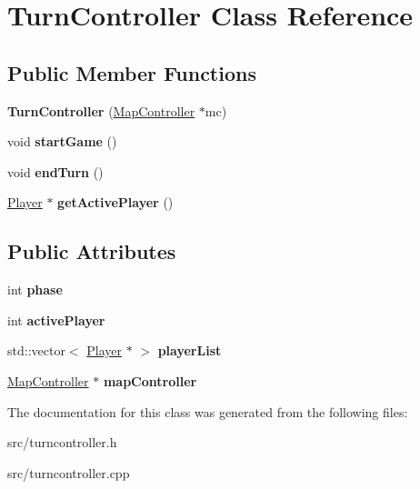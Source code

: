 \hypertarget{class_turn_controller}{}\section{Turn\+Controller Class Reference}
\label{class_turn_controller}
\subsection*{Public Member Functions}
\begin{DoxyCompactItemize}
\item 
\hypertarget{class_turn_controller_aa9e4a3c63544a55349a11c49f5a27d92}{}{\bfseries Turn\+Controller} (\hyperlink{class_map_controller}{Map\+Controller} $\ast$mc)\label{class_turn_controller_aa9e4a3c63544a55349a11c49f5a27d92}

\item 
\hypertarget{class_turn_controller_af0bf05ca649fe7b08a6fee6f7d0f4594}{}void {\bfseries start\+Game} ()\label{class_turn_controller_af0bf05ca649fe7b08a6fee6f7d0f4594}

\item 
\hypertarget{class_turn_controller_accc451d934fd5983486182ecf2c5e86a}{}void {\bfseries end\+Turn} ()\label{class_turn_controller_accc451d934fd5983486182ecf2c5e86a}

\item 
\hypertarget{class_turn_controller_a7facfb08df4a5bc9eef6af8eb4debc46}{}\hyperlink{class_player}{Player} $\ast$ {\bfseries get\+Active\+Player} ()\label{class_turn_controller_a7facfb08df4a5bc9eef6af8eb4debc46}

\end{DoxyCompactItemize}
\subsection*{Public Attributes}
\begin{DoxyCompactItemize}
\item 
\hypertarget{class_turn_controller_a0e38c2319d233f54fe0a5daaa5fef964}{}int {\bfseries phase}\label{class_turn_controller_a0e38c2319d233f54fe0a5daaa5fef964}

\item 
\hypertarget{class_turn_controller_a074a5d90344a9690c31d768402acab94}{}int {\bfseries active\+Player}\label{class_turn_controller_a074a5d90344a9690c31d768402acab94}

\item 
\hypertarget{class_turn_controller_a4f25fffc1441f66610f2ba821ac77d36}{}std\+::vector$<$ \hyperlink{class_player}{Player} $\ast$ $>$ {\bfseries player\+List}\label{class_turn_controller_a4f25fffc1441f66610f2ba821ac77d36}

\item 
\hypertarget{class_turn_controller_a84dd17d08a15c3028d19491c1926455d}{}\hyperlink{class_map_controller}{Map\+Controller} $\ast$ {\bfseries map\+Controller}\label{class_turn_controller_a84dd17d08a15c3028d19491c1926455d}

\end{DoxyCompactItemize}


The documentation for this class was generated from the following files\+:\begin{DoxyCompactItemize}
\item 
src/turncontroller.\+h\item 
src/turncontroller.\+cpp\end{DoxyCompactItemize}
